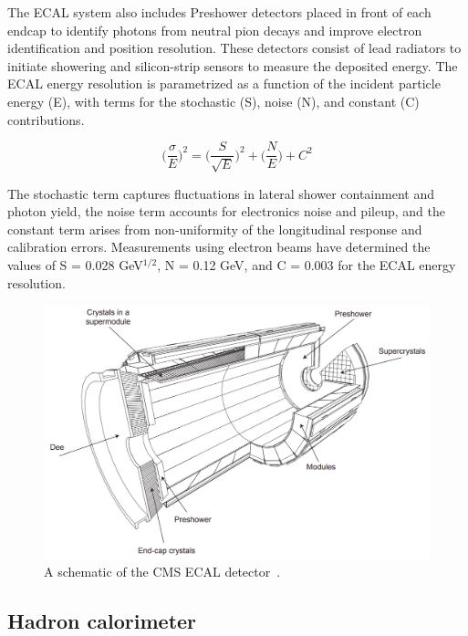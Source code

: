 The \ac{ECAL} system also includes Preshower detectors placed in front of each endcap to identify photons from neutral pion decays and improve electron identification and position resolution. 
These detectors consist of lead radiators to initiate showering and silicon-strip sensors to measure the deposited energy. 
The \ac{ECAL} energy resolution is parametrized as a function of the incident particle energy (E), with terms for the stochastic (S), noise (N), and constant (C) contributions.

\begin{equation}
\Big(\frac{\sigma}{E}\Big)^2 = \Big(\frac{S}{\sqrt{E}}\Big)^2 + \Big( \frac{N}{E} \Big) + C^2
\end{equation}

The stochastic term captures fluctuations in lateral shower containment and photon yield, the noise term accounts for electronics noise and pileup, and the constant term arises from non-uniformity of the longitudinal response and calibration errors. 
Measurements using electron beams have determined the values of S = 0.028 GeV$^{1/2}$, N = 0.12 GeV, and C = 0.003 for the ECAL energy resolution.

\begin{figure}[!hbtp]
    \centering
    \includegraphics[width=\textwidth]{Figures/ECAL.png}
    \caption{A schematic of the \ac{CMS} \ac{ECAL} detector~\cite{CMS_Setup}.}
    \label{fig:ecal}
\end{figure}

\subsection{Hadron calorimeter}

